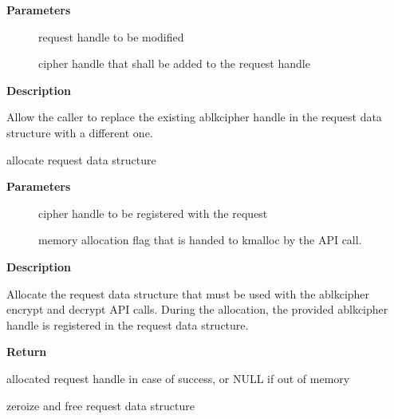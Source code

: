 \documentclass[a4paper,8pt,english]{sphinxmanual}
\begin{document}
\textbf{Parameters}
\begin{description}
\item[{}] \leavevmode
request handle to be modified

\item[{}] \leavevmode
cipher handle that shall be added to the request handle

\end{description}

\textbf{Description}

Allow the caller to replace the existing ablkcipher handle in the request
data structure with a different one.

\begin{fulllineitems}
\label{crypto/api-skcipher:c.ablkcipher_request_alloc}
allocate request data structure

\end{fulllineitems}


\textbf{Parameters}
\begin{description}
\item[{}] \leavevmode
cipher handle to be registered with the request

\item[{}] \leavevmode
memory allocation flag that is handed to kmalloc by the API call.

\end{description}

\textbf{Description}

Allocate the request data structure that must be used with the ablkcipher
encrypt and decrypt API calls. During the allocation, the provided ablkcipher
handle is registered in the request data structure.

\textbf{Return}

allocated request handle in case of success, or NULL if out of memory

\begin{fulllineitems}
\label{crypto/api-skcipher:c.ablkcipher_request_free}
zeroize and free request data structure

\end{fulllineitems}
\end{document}

